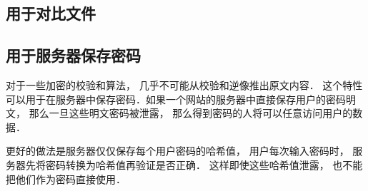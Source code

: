 
\subsection{用于对比文件}


\subsection{用于服务器保存密码}
对于一些加密的校验和算法， 几乎不可能从校验和逆像推出原文内容． 这个特性可以用于在服务器中保存密码．如果一个网站的服务器中直接保存用户的密码明文， 那么一旦这些明文密码被泄露， 那么得到密码的人将可以任意访问用户的数据．

更好的做法是服务器仅仅保存每个用户密码的哈希值， 用户每次输入密码时， 服务器先将密码转换为哈希值再验证是否正确． 这样即使这些哈希值泄露， 也不能把他们作为密码直接使用．
